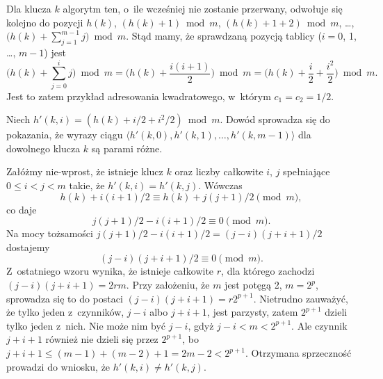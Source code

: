 
\subproblem %
Dla klucza $k$ algorytm ten, o~ile wcześniej nie zostanie przerwany, odwołuje się kolejno do pozycji $h(k)$, $(h(k)+1)\bmod m$, $(h(k)+1+2)\bmod m$, \dots, $\bigl(h(k)+\sum_{j=1}^{m-1}j\bigr)\bmod m$.
Stąd mamy, że  sprawdzaną pozycją tablicy ($i=0$, 1, \dots, $m-1$) jest
\[
	\biggl(h(k)+\sum_{j=0}^ij\biggr)\bmod m = \biggl(h(k)+\frac{i(i+1)}{2}\biggr)\bmod m = \biggl(h(k)+\frac{i}{2}+\frac{i^2}{2}\biggr)\bmod m.
\]
Jest to zatem przykład adresowania kwadratowego, w~którym $c_1=c_2=1/2$.

\subproblem %
Niech $h'(k,i)=(h(k)+i/2+i^2\!/2)\bmod m$.
Dowód sprowadza się do pokazania, że wyrazy ciągu $\langle h'(k,0),h'(k,1),\dots,h'(k,m-1)\rangle$ dla dowolnego klucza $k$ są parami różne.

Załóżmy nie-wprost, że istnieje klucz $k$ oraz liczby całkowite $i$, $j$ spełniające $0\le i<j<m$ takie, że $h'(k,i)=h'(k,j)$.
Wówczas
\[
	h(k)+i(i+1)/2 \equiv h(k)+j(j+1)/2 \pmod m,
\]
co daje
\[
	j(j+1)/2-i(i+1)/2 \equiv 0 \pmod m.
\]
Na mocy tożsamości $j(j+1)/2-i(i+1)/2=(j-i)(j+i+1)/2$ dostajemy
\[
	(j-i)(j+i+1)/2 \equiv 0 \pmod m.
\]
Z~ostatniego wzoru wynika, że istnieje całkowite $r$, dla którego zachodzi $(j-i)(j+i+1)=2rm$.
Przy założeniu, że $m$ jest potęgą 2, $m=2^p$, sprowadza się to do postaci $(j-i)(j+i+1)=r2^{p+1}$.
Nietrudno zauważyć, że tylko jeden z~czynników, $j-i$ albo $j+i+1$, jest parzysty, zatem $2^{p+1}$ dzieli tylko jeden z~nich.
Nie może nim być $j-i$, gdyż $j-i<m<2^{p+1}$.
Ale czynnik $j+i+1$ również nie dzieli się przez $2^{p+1}$, bo $j+i+1\le(m-1)+(m-2)+1=2m-2<2^{p+1}$.
Otrzymana sprzeczność prowadzi do wniosku, że $h'(k,i)\ne h'(k,j)$.


